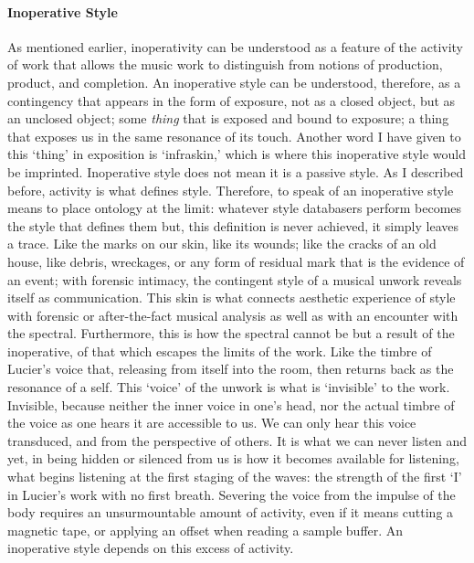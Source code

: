 \paragraph{Inoperative Style}
As mentioned earlier, inoperativity can be understood as a feature of the activity of work that allows the music work to distinguish from notions of production, product, and completion. An inoperative style can be understood, therefore, as a contingency that appears in the form of exposure, not as a closed object, but as an unclosed object; some \textit{thing} that is exposed and bound to exposure; a thing that exposes us in the same resonance of its touch. Another word I have given to this `thing' in exposition is `infraskin,' which is where this inoperative style would be imprinted. Inoperative style does not mean it is a passive style. As I described before, activity is what defines style. Therefore, to speak of an inoperative style means to place ontology at the limit: whatever style databasers perform becomes the style that defines them but, this definition is never achieved, it simply leaves a trace. Like the marks on our skin, like its wounds; like the cracks of an old house, like debris, wreckages, or any form of residual mark that is the evidence of an event; with forensic intimacy, the contingent style of a musical unwork reveals itself as communication. This skin is what connects aesthetic experience of style with forensic or after-the-fact musical analysis as well as with an encounter with the spectral. Furthermore, this is how the spectral cannot be but a result of the inoperative, of that which escapes the limits of the work. Like the timbre of Lucier's voice that, releasing from itself into the room, then returns back as the resonance of a self. This `voice' of the unwork is what is `invisible' to the work. Invisible, because neither the inner voice in one's head, nor the actual timbre of the voice as one hears it are accessible to us. We can only hear this voice transduced, and from the perspective of others. It is what we can never listen and yet, in being hidden or silenced from us is how it becomes available for listening, what begins listening at the first staging of the waves: the strength of the first `I' in Lucier's work with no first breath. Severing the voice from the impulse of the body requires an unsurmountable amount of activity, even if it means cutting a magnetic tape, or applying an offset when reading a sample buffer. An inoperative style depends on this excess of activity.

